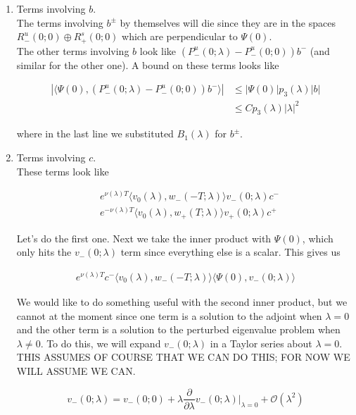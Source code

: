 \documentclass[12pt]{article}
\begin{document}
\begin{enumerate}
\item Terms involving $b$.\\

The terms involving $b^\pm$ by themselves will die since they are in the spaces $R^u_-(0; 0) \oplus R^s_+(0; 0)$ which are perpendicular to $\Psi(0)$.\\

The other terms involving $b$ look like $(P^u_-(0; \lambda) - P^u_-(0; 0))b^-$ (and similar for the other one). A bound on these terms looks like

\begin{align*}
|\langle \Psi(0), (P^u_-(0; \lambda) - P^u_-(0; 0))b^- \rangle|
&\leq |\Psi(0)| p_3(\lambda)|b| \\
&\leq C p_3(\lambda) |\lambda|^2
\end{align*}

where in the last line we substituted $B_1(\lambda)$ for $b^\pm$.

\item Terms involving $c$.\\

These terms look like

\begin{align*}
&e^{\nu(\lambda)T}  \langle v_0(\lambda), w_-(-T; \lambda) \rangle v_-(0; \lambda) c^- \\
&e^{-\nu(\lambda)T} \langle v_0(\lambda), w_+(T; \lambda) \rangle v_+(0; \lambda) c^+
\end{align*}

Let's do the first one. Next we take the inner product with $\Psi(0)$, which only hits the $v_-(0; \lambda)$ term since everything else is a scalar. This gives us 

\begin{align*}
e^{\nu(\lambda)T} c^- \langle v_0(\lambda), w_-(-T; \lambda) \rangle \langle \Psi(0), v_-(0; \lambda) \rangle
\end{align*}

We would like to do something useful with the second inner product, but we cannot at the moment since one term is a solution to the adjoint when $\lambda = 0$ and the other term is a solution to the perturbed eigenvalue problem when $\lambda \neq 0$. To do this, we will expand $v_-(0; \lambda)$ in a Taylor series about $\lambda = 0$. THIS ASSUMES OF COURSE THAT WE CAN DO THIS; FOR NOW WE WILL ASSUME WE CAN.

\[
v_-(0; \lambda) = v_-(0; 0) + \lambda \frac{\partial}{\partial \lambda}v_-(0; \lambda)\Big|_{\lambda = 0} + \mathcal{O}(\lambda^2)
\]


\end{enumerate}
\end{document}
